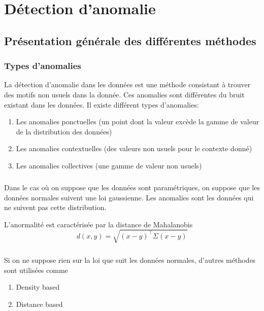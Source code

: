 
\chapter{Détection d'anomalie}

\section{Présentation générale des différentes méthodes}
\subsection{Types d'anomalies}
La détection d'anomalie dans les données est une méthode consistant à trouver des motifs non 
usuels dans la donnée. Ces anomalies sont différentes du bruit existant dans les données.
Il existe différent types d'anomalies:
\begin{enumerate}
\item Les anomalies ponctuelles (un point dont la valeur excède la gamme de valeur de la distribution des données)
\item Les anomalies contextuelles (des valeurs non usuels pour le contexte donné)
\item Les anomalies collectives (une gamme de valeur non usuels)
\end{enumerate}

\paragraph{}
Dans le cas où on suppose que les données sont paramétriques, on suppose
que les données normales suivent une loi gaussienne.
Les anomalies sont les données qui ne suivent pas cette distribution.

L'anormalité est caractérisée par la distance de Mahalanobis
\begin{equation}
d(x,y) = \sqrt{(x-y)^\top \Sigma (x-y)} 
\end{equation}


\paragraph{}
Si on ne suppose rien sur la loi que suit les données normales, d'autres méthodes sont utilisées comme 

\begin{enumerate}
\item Density based
\item Distance based
\end{enumerate}

